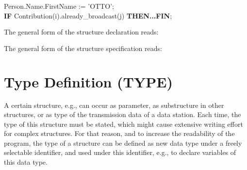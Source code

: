 Person.Name.FirstName := 'OTTO';\\
{\bf IF} Contribution(i).already\_broadcast(j) {\bf THEN...FIN};

The general form of the structure declaration reads:










The general form of the structure specification reads:




\section{Type Definition (TYPE)} %
\label{sec_type}

A certain structure, e.g., can occur as parameter, as substructure in other
structures, or as type of the transmission data of a data station.  Each
time, the type of this structure must be stated, which might cause
extensive writing effort for complex structures. For that reason, and to
increase the readability of the program, the type of a structure can be
defined as new data type under a freely selectable identifier, and used
under this identifier, e.g., to declare variables of this data type.


